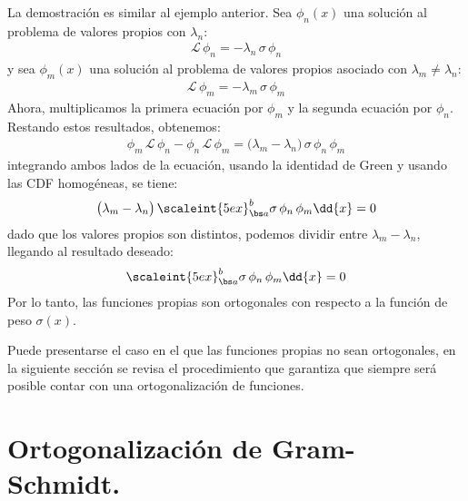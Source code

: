 La demostración es similar al ejemplo anterior. Sea $\phi_{n}(x)$ una solución al problema de valores propios con $\lambda_{n}$:
\begin{align*}
\mathcal{L} \, \phi_{n} = - \lambda_{n} \, \sigma \, \phi_{n}
\end{align*}
y sea $\phi_{m}(x)$ una solución al problema de valores propios asociado con \hfill \break $\lambda_{m} \neq \lambda_{n}$:
\begin{align*}
\mathcal{L} \, \phi_{m} = - \lambda_{m} \, \sigma \, \phi_{m}
\end{align*}
Ahora, multiplicamos la primera ecuación por $\phi_{m}$ y la segunda ecuación por $\phi_{n}$. Restando estos resultados, obtenemos:
\begin{align*}
\phi_{m}\, \mathcal{L} \, \phi_{n} - \phi_{n} \, \mathcal{L} \, \phi_{m} = \big( \lambda_{m} - \lambda_{n} \big) \, \sigma \, \phi_{n} \, \phi_{m}
\end{align*}
integrando ambos lados de la ecuación, usando la identidad de Green y usando las CDF homogéneas, se tiene:
\begin{align*}
\big( \lambda_{m} - \lambda_{n} \big) \, \scaleint{5ex}_{\bs a}^{b} \sigma \, \phi_{n} \, \phi_{m} \dd{x} = 0
\end{align*}
dado que los valores propios son distintos, podemos dividir entre $\lambda_{m} - \lambda_{n}$, llegando al resultado deseado:
\begin{align*}
\scaleint{5ex}_{\bs a}^{b} \sigma \, \phi_{n} \, \phi_{m} \dd{x} = 0
\end{align*}
Por lo tanto, las funciones propias son ortogonales con respecto a la función de peso $\sigma(x)$.
\par
Puede presentarse el caso en el que las funciones propias no sean ortogonales, en la siguiente sección se revisa el procedimiento que garantiza que siempre será posible contar con una ortogonalización de funciones.

\section{Ortogonalización de Gram-Schmidt.}

